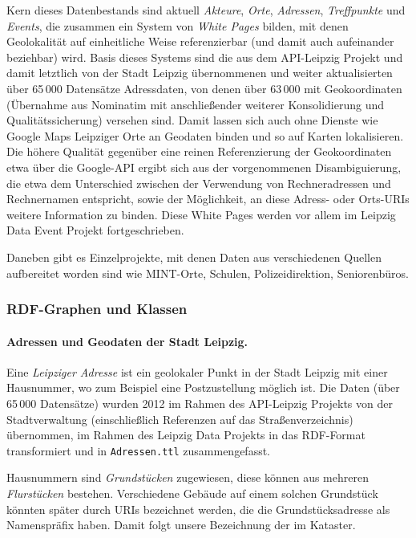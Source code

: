 \documentclass[a4paper,11pt]{article}
\begin{document}
Kern dieses Datenbestands sind aktuell \emph{Akteure}, \emph{Orte},
\emph{Adressen}, \emph{Treffpunkte} und \emph{Events}, die zusammen ein System
von \emph{White Pages} bilden, mit denen Geolokalität auf einheitliche Weise
referenzierbar (und damit auch aufeinander beziehbar) wird. Basis dieses
Systems sind die aus dem API-Leipzig Projekt und damit letztlich von der Stadt
Leipzig übernommenen und weiter aktualisierten über 65\,000 Datensätze
Adressdaten, von denen über 63\,000 mit Geokoordinaten (Übernahme aus
Nominatim mit anschließender weiterer Konsolidierung und Qualitätssicherung)
versehen sind. Damit lassen sich auch ohne Dienste wie Google Maps Leipziger
Orte an Geodaten binden und so auf Karten lokalisieren. Die höhere Qualität
gegenüber eine reinen Referenzierung der Geokoordinaten etwa über die
Google-API ergibt sich aus der vorgenommenen Disambiguierung, die etwa dem
Unterschied zwischen der Verwendung von Rechneradressen und Rechnernamen
entspricht, sowie der Möglichkeit, an diese Adress- oder Orts-URIs weitere
Information zu binden. Diese White Pages werden vor allem im Leipzig Data
Event Projekt fortgeschrieben.

Daneben gibt es Einzelprojekte, mit denen Daten aus verschiedenen Quellen
aufbereitet worden sind wie MINT-Orte, Schulen, Polizeidirektion,
Seniorenbüros.

\subsubsection*{RDF-Graphen und Klassen}

\paragraph{Adressen und Geodaten der Stadt Leipzig.} 
Eine \emph{Leipziger Adresse} ist ein geolokaler Punkt in der Stadt Leipzig
mit einer Hausnummer, wo zum Beispiel eine Postzustellung möglich ist. Die
Daten (über 65\,000 Datensätze) wurden 2012 im Rahmen des API-Leipzig Projekts
von der Stadtverwaltung (einschließlich Referenzen auf das Straßenverzeichnis)
übernommen, im Rahmen des Leipzig Data Projekts in das RDF-Format
transformiert und in \texttt{Adressen.ttl} zusammengefasst.

Hausnummern sind \emph{Grundstücken} zugewiesen, diese können aus mehreren
\emph{Flurstücken} bestehen. Verschiedene Gebäude auf einem solchen Grundstück
könnten später durch URIs bezeichnet werden, die die Grundstücksadresse als
Namenspräfix haben. Damit folgt unsere Bezeichnung der im Kataster.
\end{document}
